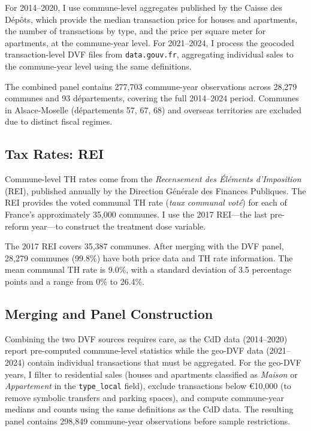 \documentclass[12pt]{article}
\begin{document}
For 2014--2020, I use commune-level aggregates published by the Caisse des D\'{e}p\^{o}ts, which provide the median transaction price for houses and apartments, the number of transactions by type, and the price per square meter for apartments, at the commune-year level. For 2021--2024, I process the geocoded transaction-level DVF files from \texttt{data.gouv.fr}, aggregating individual sales to the commune-year level using the same definitions.

The combined panel contains 277,703 commune-year observations across 28,279 communes and 93 d\'{e}partements, covering the full 2014--2024 period. Communes in Alsace-Moselle (d\'{e}partements 57, 67, 68) and overseas territories are excluded due to distinct fiscal regimes.

\subsection{Tax Rates: REI}

Commune-level TH rates come from the \emph{Recensement des \'{E}l\'{e}ments d'Imposition} (REI), published annually by the Direction G\'{e}n\'{e}rale des Finances Publiques. The REI provides the voted communal TH rate (\emph{taux communal vot\'{e}}) for each of France's approximately 35,000 communes. I use the 2017 REI---the last pre-reform year---to construct the treatment dose variable.

The 2017 REI covers 35,387 communes. After merging with the DVF panel, 28,279 communes (99.8\%) have both price data and TH rate information. The mean communal TH rate is 9.0\%, with a standard deviation of 3.5 percentage points and a range from 0\% to 26.4\%.

\subsection{Merging and Panel Construction}

Combining the two DVF sources requires care, as the CdD data (2014--2020) report pre-computed commune-level statistics while the geo-DVF data (2021--2024) contain individual transactions that must be aggregated. For the geo-DVF years, I filter to residential sales (houses and apartments classified as \emph{Maison} or \emph{Appartement} in the \texttt{type\_local} field), exclude transactions below \euro{}10,000 (to remove symbolic transfers and parking spaces), and compute commune-year medians and counts using the same definitions as the CdD data. The resulting panel contains 298,849 commune-year observations before sample restrictions.
\end{document}
